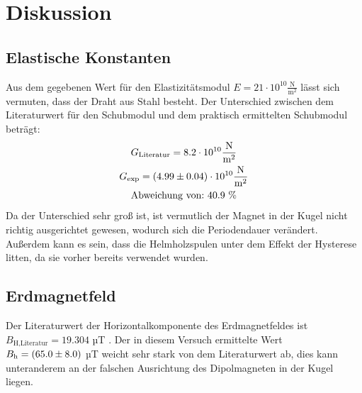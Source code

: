 \section{Diskussion}
\label{sec:Diskussion}
\subsection{Elastische Konstanten}
Aus dem gegebenen Wert für den Elastizitätsmodul $E = 21 \cdot 10^{10} \frac{\text{N}}{\text{m}^2}$ lässt sich vermuten, dass der Draht aus Stahl besteht. Der Unterschied zwischen dem Literaturwert für den Schubmodul und dem praktisch ermittelten Schubmodul beträgt:
\begin{gather*}
  G_\text{Literatur} = 8.2 \cdot 10^{10} \frac{\text{N}}{\text{m}^2} \\
  G_\text{exp} = (\num{4.99 +- 0.04}) \cdot 10^{10} \frac{\text{N}}{\text{m}^2} \\
  \text{Abweichung von:} \ 40.9 \ \%
\end{gather*}
Da der Unterschied sehr groß ist, ist vermutlich der Magnet in der Kugel nicht richtig ausgerichtet gewesen, wodurch sich die Periodendauer verändert. Außerdem kann es sein, dass die Helmholzspulen unter dem Effekt der Hysterese litten, da sie vorher bereits verwendet wurden.

\subsection{Erdmagnetfeld}
Der Literaturwert der Horizontalkomponente des Erdmagnetfeldes ist \\ $B_\text{H,Literatur} = 19.304$ µT \cite{Literatur}. Der in diesem Versuch ermittelte Wert \\ $B_\text{h} = (\num{65.0 +- 8.0})$ µT weicht sehr stark von dem Literaturwert ab, dies kann unteranderem an der falschen Ausrichtung des Dipolmagneten in der Kugel liegen.  
